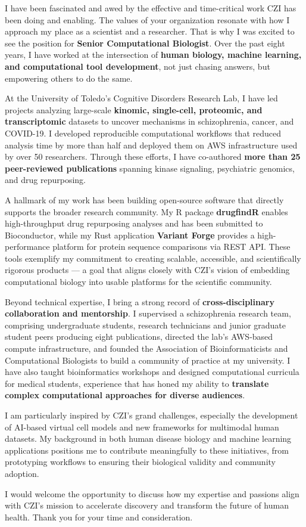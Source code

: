 \documentclass[10pt,letterpaper,sans]{moderncv}
\date{\today}
\begin{document}
\makelettertitle

I have been fascinated and awed by the effective and time-critical work CZI
has been doing and enabling. The values of your organization resonate with
how I approach my place as a scientist and a researcher. That is why I was excited
to see the position for \textbf{Senior Computational Biologist}.
Over the past eight years, I have worked at the
intersection of \textbf{human biology, machine learning, and computational tool
    development}, not just chasing answers, but empowering others to do the same.

At the University of Toledo's Cognitive Disorders Research Lab, I have led
projects analyzing large-scale \textbf{kinomic, single-cell, proteomic, and
    transcriptomic} datasets to uncover mechanisms in schizophrenia, cancer, and
COVID-19. I developed reproducible computational workflows that reduced
analysis time by more than half and deployed them on AWS infrastructure used
by over 50 researchers. Through these efforts, I have co-authored \textbf{more
    than 25 peer-reviewed publications} spanning kinase signaling,
psychiatric genomics, and drug repurposing.

A hallmark of my work has been building open-source software that directly
supports the broader research community. My R package \textbf{drugfindR}
enables high-throughput drug repurposing analyses and has been submitted to
Bioconductor, while my Rust application \textbf{Variant Forge} provides a
high-performance platform for protein sequence comparisons via REST API. These
tools exemplify my commitment to creating scalable, accessible, and
scientifically rigorous products — a goal that aligns closely with CZI's
vision of embedding computational biology into usable platforms for the
scientific community.

Beyond technical expertise, I bring a strong record of \textbf{cross-disciplinary
    collaboration and mentorship}. I supervised a schizophrenia research team,
comprising undergraduate students, research technicians and junior graduate student peers
producing eight publications, directed the lab's AWS-based compute
infrastructure, and founded the Association of Bioinformaticists and Computational
Biologists to build a community of practice at my university. I have also
taught bioinformatics workshops and designed computational curricula for medical
students, experience that has honed my ability to \textbf{translate complex
    computational approaches for diverse audiences}.

I am particularly inspired by CZI's grand challenges, especially the development
of AI-based virtual cell models and new frameworks for multimodal human
datasets. My background in both human disease biology and machine learning
applications positions me to contribute meaningfully to these initiatives, from
prototyping workflows to ensuring their biological validity and community
adoption.

I would welcome the opportunity to discuss how my expertise and passions align
with CZI's mission to accelerate discovery and transform the future of
human health. Thank you for your time and consideration.

\makeletterclosing
\end{document}
